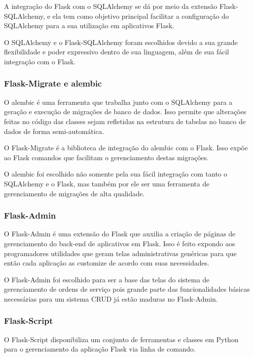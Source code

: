 \documentclass[
	article,			%
	11pt,				%
	oneside,			%
	a4paper,			%
	english,			%
	brazil,				%
	sumario=tradicional
	]{abntex2}
\begin{document}
A integração do Flask com o SQLAlchemy se dá por meio da extensão Flask-SQLAlchemy, e ela tem como objetivo principal facilitar a configuração do SQLAlchemy para a sua utilização em aplicativos Flask. \cite{flasksqlalchemy}

O SQLAlchemy e o Flask-SQLAlchemy foram escolhidos devido a sua grande flexibilidade e poder expressivo dentro de sua linguagem, além de sua fácil integração com o Flask.

\subsubsection{Flask-Migrate e alembic}

O alembic é uma ferramenta que trabalha junto com o SQLAlchemy para a geração e execução de migrações de banco de dados.
Isso permite que alterações feitas no código das classes sejam refletidas na estrutura de tabelas no banco de dados de forma semi-automática. \cite{alembic}

O Flask-Migrate é a biblioteca de integração do alembic com o Flask.
Isso expõe ao Flask comandos que facilitam o gerenciamento destas migrações. \cite{flaskmigrate}

O alembic foi escolhido não somente pela sua fácil integração com tanto o SQLAlchemy e o Flask, mas também por ele ser uma ferramenta de gerenciamento de migrações de alta qualidade.

\subsubsection{Flask-Admin}

O Flask-Admin é uma extensão do Flask que auxilia a criação de páginas de gerenciamento do back-end de aplicativos em Flask.
Isso é feito expondo aos programadores utilidades que geram telas administrativas genéricas para que então cada aplicação as customize de acordo com suas necessidades. \cite{flaskadmin}

O Flask-Admin foi escolhido para ser a base das telas do sistema de gerenciamento de ordens de serviço pois grande parte das funcionalidades básicas necessárias para um sistema CRUD já estão maduras no Flask-Admin.

\subsubsection{Flask-Script}

O Flask-Script disponibiliza um conjunto de ferramentas e classes em Python para o gerenciamento da aplicação Flask via linha de comando.
\end{document}
